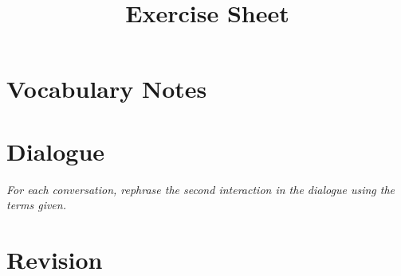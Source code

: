 \documentclass{article}
\title{Exercise Sheet}
\begin{document}
\section{Vocabulary Notes}

%
%
%
%
%
%
%
%
%
%
%
%
%
%
%
%
%
%
%
%


\newpage
\section{Dialogue}

\noindent \textit{For each conversation, rephrase the second interaction in the dialogue using the terms given.}

%
%
%
%
%
%
%
%
%
%
%
%
%
%
%
%
%
%
%
%

\newpage
\section{Revision}

%
%
%
%
%
%
%
%
%
%
%
%
%
%
%
%
%
%
%
%
\end{document}
